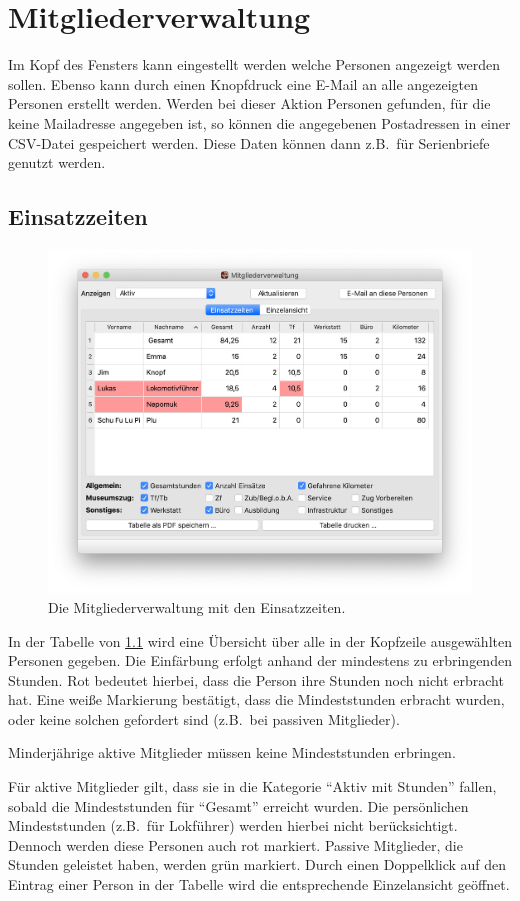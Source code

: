 \chapter{Mitgliederverwaltung}\label{einsatz:personal}
Im Kopf des Fensters kann eingestellt werden welche Personen angezeigt werden sollen.
Ebenso kann durch einen Knopfdruck eine E-Mail an alle angezeigten Personen erstellt werden.
Werden bei dieser Aktion Personen gefunden, für die keine Mailadresse angegeben ist,
so können die angegebenen Postadressen in einer CSV-Datei gespeichert werden.
Diese Daten können dann z.B.\ für Serienbriefe genutzt werden.

\section{Einsatzzeiten}\label{einsatz:personal:zeiten}
\begin{figure}[!h]
	\includegraphics[width=\textwidth]{img/personal_gesamt}
	\caption{Die Mitgliederverwaltung mit den Einsatzzeiten.}
	\label{fig:einsatz:personal:zeiten}
\end{figure}
In der Tabelle von \cref{fig:einsatz:personal:zeiten} wird eine Übersicht über alle in der Kopfzeile ausgewählten Personen gegeben.
Die Einfärbung erfolgt anhand der mindestens zu erbringenden Stunden.
Rot bedeutet hierbei, dass die Person ihre Stunden noch nicht erbracht hat.
Eine weiße Markierung bestätigt, dass die Mindeststunden erbracht wurden, oder keine solchen gefordert sind (z.B.\ bei passiven Mitglieder).
\begin{neu}
Minderjährige aktive Mitglieder müssen keine Mindeststunden erbringen.
\end{neu}
Für aktive Mitglieder gilt, dass sie in die Kategorie "`Aktiv mit Stunden"' fallen, sobald die Mindeststunden für "`Gesamt"' erreicht wurden.
Die persönlichen Mindeststunden (z.B.\ für Lokführer)
werden hierbei nicht berücksichtigt.
Dennoch werden diese Personen auch rot markiert.
Passive Mitglieder, die Stunden geleistet haben, werden grün markiert.
Durch einen Doppelklick auf den Eintrag einer Person in der Tabelle wird die entsprechende Einzelansicht geöffnet.


